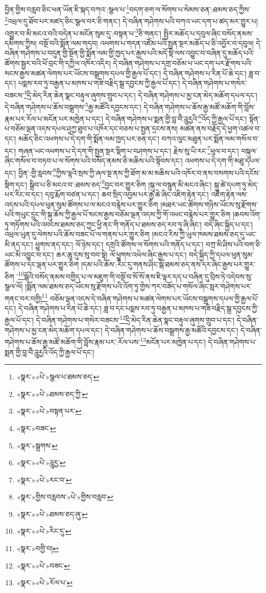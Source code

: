 བྱིན་གྱིས་བརླབ་ཅིང་ཕན་ཡོན་ཇི་སྐད་བཀའ་:སྩལ་པ་\footnote{«སྣར་»«པེ་»སྩལ་པ་ཐམས་ཅད་}བདག་ཅག་ལ་སོགས་པ་སེམས་ཅན་:ཐམས་ཅད་ཀྱིས་\footnote{«སྣར་»«པེ་»ཐམས་ཅད་ཀྱི་}འཕྲལ་དུ་ཐོབ་པར་མཛད་ཅིང་སྩལ་བར་ཅི་གནང་། དེ་བཞིན་གཤེགས་པའི་བཀའ་ཡང་དག་པ་ཚད་མར་གྱུར་པ། འགྱུར་བ་མི་མངའ་བའི་བདེན་པ་མངོན་སུམ་དུ་:བསྟན་པ་\footnote{«སྣར་»«པེ་»བསྟན་པར་}ཅི་གནང་། སྤྱིར་མཆོད་པ་དབུལ་ཞིང་བསོད་ནམས་དམིགས་ཀྱིས། བསྔོ་བའི་སྨོན་ལམ་གདབ། འཕགས་པ་གདན་འཛོམ་པའི་སྤྱན་སྔར་མཆོད་པ་ཅི་འབྱོར་བ་དབུལ། དེ་བཞིན་གཤེགས་པ་བདུན་གྱི་སྔོན་གྱི་སྨོན་ལམ་གྱི་ཁྱད་པར་རྒྱས་པའི་མདོ་སྡེ་ལས་འབྱུང་བ་བཞིན་དུ་མཆོད་པའི་ཚོགས་སྦྱར་བའི་ཕོ་བྲང་གི་དཀྱིལ་འཁོར་འདིར། དེ་བཞིན་གཤེགས་པ་དགྲ་བཅོམ་པ་ཡང་དག་པར་རྫོགས་པའི་སངས་རྒྱས་མཚན་ལེགས་པར་ཡོངས་བསྒྲགས་དཔལ་གྱི་རྒྱལ་པོ་དང་། དེ་བཞིན་གཤེགས་པ་རིན་པོ་ཆེ་དང་། ཟླ་བ་དང་། པདྨས་རབ་ཏུ་བརྒྱན་པ་མཁས་པ་གཟི་བརྗིད་སྒྲ་དབྱངས་ཀྱི་རྒྱལ་པོ་དང་། དེ་བཞིན་གཤེགས་པ་གསེར་བཟངས་\footnote{«སྣར་»བཟང་}དྲི་མེད་རིན་ཆེན་སྣང་བརྟུལ་ཞུགས་གྲུབ་པ་དང་། དེ་བཞིན་གཤེགས་པ་མྱ་ངན་མེད་མཆོག་དཔལ་དང་། དེ་བཞིན་གཤེགས་པ་ཆོས་བསྒྲགས་\footnote{«སྣར་»སྒྲགས་}རྒྱ་མཚོའི་དབྱངས་དང་། དེ་བཞིན་གཤེགས་པ་ཆོས་རྒྱ་མཚོ་མཆོག་གི་བློས་རྣམ་པར་རོལ་པ་མངོན་པར་མཁྱེན་པ་དང་། དེ་བཞིན་གཤེགས་པ་སྨན་གྱི་བླ་བཻ་ཌཱུརྱའི་\footnote{«སྣར་»«པེ་»ཌཱུརྱ་}འོད་ཀྱི་རྒྱལ་པོ་དང་། སྟོན་པ་བཅོམ་ལྡན་འདས་དཔལ་ཤཱཀྱ་ཐུབ་པ་འཁོར་དང་བཅས་པ་སྤྱན་དྲངས་ནས། མཚན་ནས་བརྗོད་དེ་ཕྱག་འཚལ་བ་དང་། མཆོད་ཅིང་འཕགས་པ་དེ་དག་གི་སྨོན་ལམ་ཁྱད་པར་ཅན་དང་། བཀའ་ལུང་མཐུན་པར་སྨོན་ལམ་གསོལ་བ་དང་། གཞན་ཡང་འཕགས་པ་དེ་དག་གི་སྤྱན་སྔར་སྡིག་པ་བཤགས་པ་དང་། རྗེས་སུ་ཡི་རང་\footnote{«སྣར་»«པེ་»རང་བ་}ཕུལ་བ་དང་། བསྐུལ་ཞིང་གསོལ་བ་བཏབ་པ་ལ་སོགས་པའི་བསོད་ནམས་ཅི་མཆིས་པའི་སྟོབས་དང་། འཕགས་པ་དེ་དག་གི་མཐུ་དཔལ་དང་། བྱིན་:གྱི་རླབས་\footnote{«སྣར་»གྱིས་བརླབས་«པེ་»གྱིས་བརླབ་}ཀྱིས་ལྷའི་སྲས་ཀྱི་ཞལ་སྔ་ནས་ཀྱི་ཐོག་མ་མ་མཆིས་པའི་འཁོར་བ་ནས་བསགས་པའི་དངོས་སྡིག་དང་། སྒྲིབ་པ་ཅི་མངའ་བ་:ཐམས་ཅད་\footnote{«སྣར་»«པེ་»ཐམས་ཅད་ཞུ་}བྱང་བར་གྱུར་ཅིག །སྐུ་ལ་བསྙུན་མི་མངའ་ཞིང་། སྐུ་ཚེ་དཔག་ཏུ་མེད་པར་རིང་བ་དང་། དབུ་རྨོག་བཙན་པ་དང་། ཆབ་སྲིད་འབྱམ་པར་རྒྱ་ཆེ་ཞིང་འཇིག་རྟེན་དང་། འཇིག་རྟེན་ལས་འདས་པའི་དཔལ་ཕུན་སུམ་ཚོགས་པ་ལ་མངའ་བརྙེས་པར་གྱུར་ཅིག །མཐར་ཡང་ཚོགས་གཉིས་ཡོངས་སུ་རྫོགས་པའི་གཡུང་དྲུང་གི་སྐུ་ཆོས་ཀྱི་རྒྱལ་པོ་སངས་རྒྱས་བཅོམ་ལྡན་འདས་ཀྱི་གོ་འཕང་བརྙེས་པར་གྱུར་ཅིག །ཆབས་འོག་ཏུ་གཏོགས་པའི་འབངས་ཐམས་ཅད་ཀྱང་ཕྱི་ནང་གི་གནོད་པ་ཐམས་ཅད་རབ་ཏུ་ཞི་ཞིང་། བདེ་ཞིང་སྐྱིད་པ་དང་། འཕྲལ་ཡུན་དུ་ལེགས་པའི་ཆོས་བཟང་པོ་ལ་གནས་པར་གྱུར་ཅིག །མངའ་རིས་ཀྱི་ཡུལ་ཁམས་ཐམས་ཅད་དུ་ཡང་མི་ནད་དང་། ཕྱུགས་ནད་དང་། ལོ་ཉེས་དང་། དགྲའི་ཚོགས་ལ་སོགས་པའི་གནོད་པ་དང་། བཀྲ་མི་ཤིས་པའི་བག་ཅི་ཡང་མི་འབྱུང་བ་དང་། ཆར་ཆུ་དུས་སུ་བབ་སྟེ། ལོ་ཕྱུགས་འཕེལ་ཞིང་རྒྱས་པ་དང་། བདེ་སྐྱིད་ཀྱི་དཔལ་ཕུན་སུམ་ཚོགས་པ་དང་ལྡན་པར་གྱུར་ཅིག །དམ་པའི་ཆོས་:རིང་དུ་གནས་ཤིང་སྒོ་ཐམས་ཅད་ནས་དར་ཞིང་རྒྱས་པར་གྱུར་ཅིག ་\footnote{«སྣར་»«པེ་»རིང་དུ་}སྒོའི་བསོད་ནམས་བགྱིད་པ་ལ་མཇུག་གི་བསྔོ་བ་སོ་སོ་ནས་ཇི་ལྟར་དད་པ་བཞིན་དུ་བྲིས་ཏེ་འདེབས་སུ་སྩལ་ལོ། །སྨོན་ལམ་ཐམས་ཅད་ཡོངས་སུ་རྫོགས་པའི་འོག་ཏུ་གྱེས་ཀར་བཟོད་པ་གསོལ་ཞིང་སླར་གཤེགས་པར་གནང་བར་བགྱི།\footnote{«སྣར་»བགྱི་བ།} བཅོམ་ལྡན་འདས་དེ་བཞིན་གཤེགས་པ་མཚན་ལེགས་པར་ཡོངས་བསྒྲགས་དཔལ་གྱི་རྒྱལ་པོ་དང་། དེ་བཞིན་གཤེགས་པ་རིན་པོ་ཆེ་དང་། ཟླ་བ་དང་པདྨས་རབ་ཏུ་བརྒྱན་པ་མཁས་པ་གཟི་བརྗིད་སྒྲ་དབྱངས་ཀྱི་རྒྱལ་པོ་དང་། དེ་བཞིན་གཤེགས་པ་གསེར་བཟངས་\footnote{«སྣར་»«པེ་»བཟང་}དྲི་མེད་རིན་ཆེན་སྣང་བརྟུལ་ཞུགས་གྲུབ་པ་དང་། དེ་བཞིན་གཤེགས་པ་མྱ་ངན་མེད་མཆོག་དཔལ་དང་། དེ་བཞིན་གཤེགས་པ་ཆོས་བསྒྲགས་རྒྱ་མཚོའི་དབྱངས་དང་། དེ་བཞིན་གཤེགས་པ་ཆོས་རྒྱ་མཚོ་མཆོག་གི་བློས་རྣམ་པར་:རོལ་པས་\footnote{«སྣར་»«པེ་»རོལ་པ་}མངོན་པར་མཁྱེན་པ་དང་། དེ་བཞིན་གཤེགས་པ་སྨན་གྱི་བླ་བཻ་ཌཱུརྱའི་འོད་ཀྱི་རྒྱལ་པོ་དང་། 